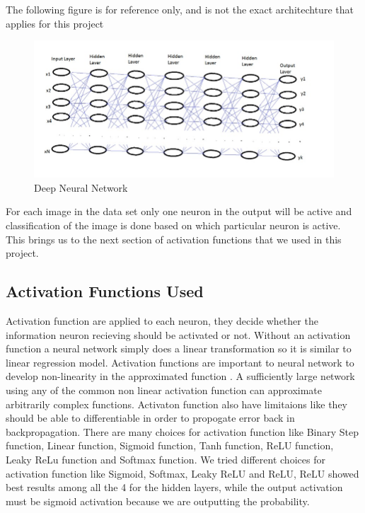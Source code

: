 The following figure is for reference only, and is not the exact architechture
that applies for this project

\begin{figure}[!ht]
        \centering\includegraphics[width=\columnwidth]
        {images/neural-network.jpeg}
        \caption{Deep Neural Network}\label{s:Deep Neural Network}
\end{figure}


For each image in the data set only one neuron in the output will be active
and classification of the image is done based on which particular neuron is
active. This brings us to the next section of activation functions that we
used in this project.



\subsection{Activation Functions Used}

Activation function are applied to each neuron, they decide whether the
information neuron recieving should be activated or not. Without an activation
function a neural network simply does a linear transformation so it is similar
to linear regression model. Activation functions are important to neural
network to develop non-linearity in the approximated function . A sufficiently
large network using any of the common non linear activation function can
approximate arbitrarily complex functions. Activaton function also have
limitaions like they should be able to differentiable in order to propogate
error back in backpropagation. There are many choices for activation function
like Binary Step function, Linear function, Sigmoid function, Tanh function,
ReLU function, Leaky ReLu function and Softmax function. We tried different
choices for activation function like Sigmoid, Softmax, Leaky ReLU and ReLU,
ReLU showed best results among all the 4 for the hidden layers, while the
output activation must be sigmoid activation because we are outputting the
probability. 


